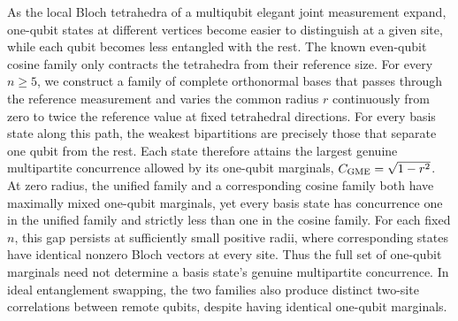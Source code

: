 As the local Bloch tetrahedra of a multiqubit elegant joint measurement expand, one-qubit states at different vertices become easier to distinguish at a given site, while each qubit becomes less entangled with the rest. The known even-qubit cosine family only contracts the tetrahedra from their reference size. For every $n\ge5$, we construct a family of complete orthonormal bases that passes through the reference measurement and varies the common radius $r$ continuously from zero to twice the reference value at fixed tetrahedral directions. For every basis state along this path, the weakest bipartitions are precisely those that separate one qubit from the rest. Each state therefore attains the largest genuine multipartite concurrence allowed by its one-qubit marginals, $C_{\rm GME}=\sqrt{1-r^2}$. At zero radius, the unified family and a corresponding cosine family both have maximally mixed one-qubit marginals, yet every basis state has concurrence one in the unified family and strictly less than one in the cosine family. For each fixed $n$, this gap persists at sufficiently small positive radii, where corresponding states have identical nonzero Bloch vectors at every site. Thus the full set of one-qubit marginals need not determine a basis state's genuine multipartite concurrence. In ideal entanglement swapping, the two families also produce distinct two-site correlations between remote qubits, despite having identical one-qubit marginals.
